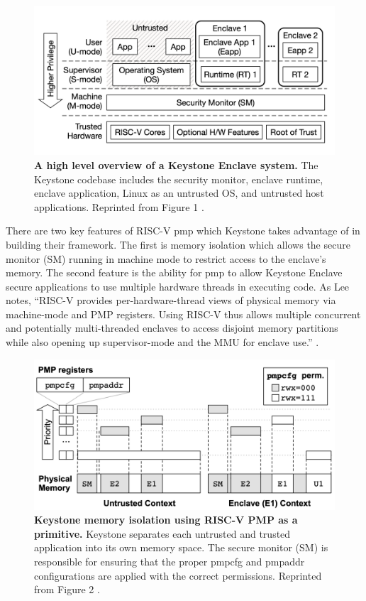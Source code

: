 \begin{figure}[ht]
\includegraphics[width=\textwidth]{img/keystone-diagram-tmp.png}
\caption[Keystone System Overview]{\textbf{A high level overview of a Keystone Enclave system.} The Keystone codebase includes the security monitor, enclave runtime, enclave application, Linux as an untrusted OS, and untrusted host applications. Reprinted from Figure 1 \cite{lee2019keystone}.
\label{figure:keystone-overview}}
\end{figure}

There are two key features of RISC-V \gls{pmp} which Keystone takes advantage of in building their framework. The first is memory isolation which allows the secure monitor (SM) running in machine mode to restrict access to the enclave's memory. The second feature is the ability for \gls{pmp} to allow Keystone Enclave secure applications to use multiple hardware threads in executing code. As Lee notes, ``RISC-V provides per-hardware-thread views of physical memory via machine-mode and PMP registers. Using RISC-V thus allows multiple concurrent and potentially multi-threaded enclaves to access disjoint memory partitions while also opening up supervisor-mode and the MMU for enclave use.'' \cite{lee2020keystone}. 

\begin{figure}[ht]
\includegraphics[width=\textwidth]{img/keystone-pmp-tmp.png}
\caption[Keystone PMP Protection]{\textbf{Keystone memory isolation using RISC-V PMP as a primitive.} Keystone separates each untrusted and trusted application into its own memory space. The secure monitor (SM) is responsible for ensuring that the proper pmpcfg and pmpaddr configurations are applied with the correct permissions. Reprinted from Figure 2 \cite{lee2019keystone}.
\label{figure:keystone-pmp}}
\end{figure}

